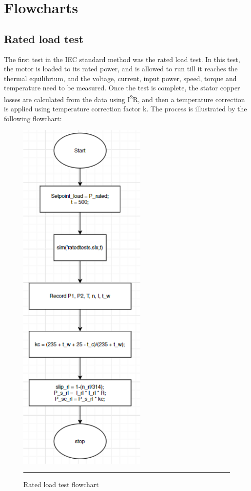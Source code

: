 \section{Flowcharts}
\subsection{Rated load test}
The first test in the IEC standard method was the rated load test. In this test, the motor is loaded to its rated power, and is allowed to run till it reaches the thermal equilibrium, and the voltage, current, input power, speed, torque and temperature need to be measured.
Once the test is complete, the stator copper losses are calculated from the data using I\textsuperscript{2}R, and then a temperature correction is applied using temperature correction factor k. The process is illustrated by the following flowchart:
\begin{figure}[htbp]
	\centering
		\includegraphics[width = 2.5in]{./Figures/MS/fig42.png}
		\rule{35em}{0.5pt}
	\caption{Rated load test flowchart}
	\label{fig:Rated load test flowchart} 
\end{figure}
\newpage

